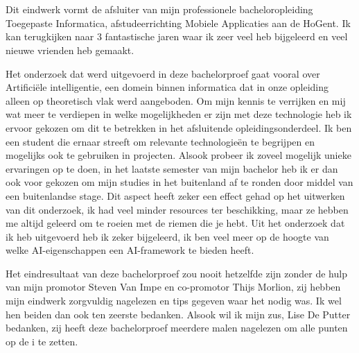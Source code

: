 
\chapter*{}
\label{ch:voorwoord}

Dit eindwerk vormt de afsluiter van mijn professionele bacheloropleiding Toegepaste Informatica, afstudeerrichting Mobiele Applicaties aan de HoGent. Ik kan terugkijken naar 3 fantastische jaren waar ik zeer veel heb bijgeleerd en veel nieuwe vrienden heb gemaakt.

Het onderzoek dat werd uitgevoerd in deze bachelorproef gaat vooral over Artificiële intelligentie, een domein binnen informatica dat in onze opleiding alleen op theoretisch vlak werd aangeboden. Om mijn kennis te verrijken en mij wat meer te verdiepen in welke mogelijkheden er zijn met deze technologie heb ik ervoor gekozen om dit te betrekken in het afsluitende opleidingsonderdeel. Ik ben een student die ernaar streeft om relevante technologieën te begrijpen en mogelijks ook te gebruiken in projecten. Alsook probeer ik zoveel mogelijk unieke ervaringen op te doen, in het laatste semester van mijn bachelor heb ik er dan ook voor gekozen om mijn studies in het buitenland af te ronden door middel van een buitenlandse stage. Dit aspect heeft zeker een effect gehad op het uitwerken van dit onderzoek, ik had veel minder resources ter beschikking, maar ze hebben me altijd geleerd om te roeien met de riemen die je hebt.
Uit het onderzoek dat ik heb uitgevoerd heb ik zeker bijgeleerd, ik ben veel meer op de hoogte van welke AI-eigenschappen een AI-framework te bieden heeft.

Het eindresultaat van deze bachelorproef zou nooit hetzelfde zijn zonder de hulp van mijn promotor Steven Van Impe en co-promotor Thijs Morlion, zij hebben mijn eindwerk zorgvuldig nagelezen en tips gegeven waar het nodig was. Ik wel hen beiden dan ook ten zeerste bedanken. Alsook wil ik mijn zus, Lise De Putter bedanken, zij heeft deze bachelorproef meerdere malen nagelezen om alle punten op de i te zetten.

